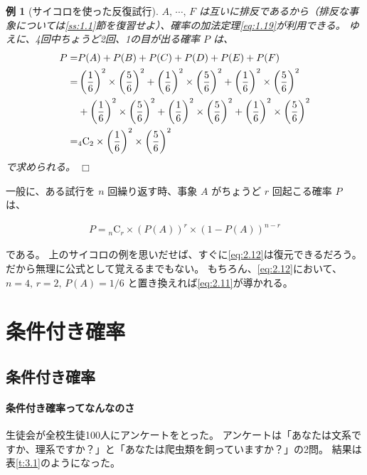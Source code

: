\documentclass[12pt]{ltjsarticle}\usepackage{ifthen}\newcounter{enlarge}\setcounter{enlarge}{1}
\def\qed{\hfill $\Box$}
\newtheorem{eg}{例}
\begin{document}
\begin{eg}[サイコロを使った反復試行]
    $A,\, \cdots,\, F$ は互いに排反であるから（排反な事象については\ref{ss:1.1}節を復習せよ）、確率の加法定理\eqref{eq:1.19}が利用できる。
    ゆえに、4回中ちょうど2回、1の目が出る確率 $P$ は、
    \begin{align}
      P =& P(A) + P(B) + P(C) + P(D) + P(E) + P(F) \notag \\
      =& \left( \frac{1}{6} \right)^2 \times \left( \frac{5}{6} \right)^2 + \left( \frac{1}{6} \right)^2 \times \left( \frac{5}{6} \right)^2 + \left( \frac{1}{6} \right)^2 \times \left( \frac{5}{6} \right)^2 \notag \\
         &+ \left( \frac{1}{6} \right)^2 \times \left( \frac{5}{6} \right)^2 + \left( \frac{1}{6} \right)^2 \times \left( \frac{5}{6} \right)^2 + \left( \frac{1}{6} \right)^2 \times \left( \frac{5}{6} \right)^2 \notag \\
        =& {}_4 \mathrm{C}_2 \times \left( \frac{1}{6} \right)^2 \times \left( \frac{5}{6} \right)^2 \label{eq:2.11}
    \end{align}
    で求められる。    
\qed\end{eg}

一般に、ある試行を $n$ 回繰り返す時、事象 $A$ がちょうど $r$ 回起こる確率 $P$ は、
\begin{oframed}
  \begin{align}
     P = {}_n \mathrm{C}_r \times \left( P(A) \right)^r \times \left( 1 - P(A) \right)^{n-r}  \label{eq:2.12}
  \end{align}
\end{oframed}
\noindent
である。
上のサイコロの例を思いだせば、すぐに\eqref{eq:2.12}は復元できるだろう。
だから無理に公式として覚えるまでもない。
もちろん、\eqref{eq:2.12}において、$n = 4,\, r = 2,\, P(A) = 1/6$ と置き換えれば\eqref{eq:2.11}が導かれる。

\section{条件付き確率}

\subsection{条件付き確率} \label{ss:3.1}

\paragraph{条件付き確率ってなんなのさ}

生徒会が全校生徒100人にアンケートをとった。
アンケートは「あなたは文系ですか、理系ですか？」と「あなたは爬虫類を飼っていますか？」の2問。
結果は表\ref{t:3.1}のようになった。
\end{document}

